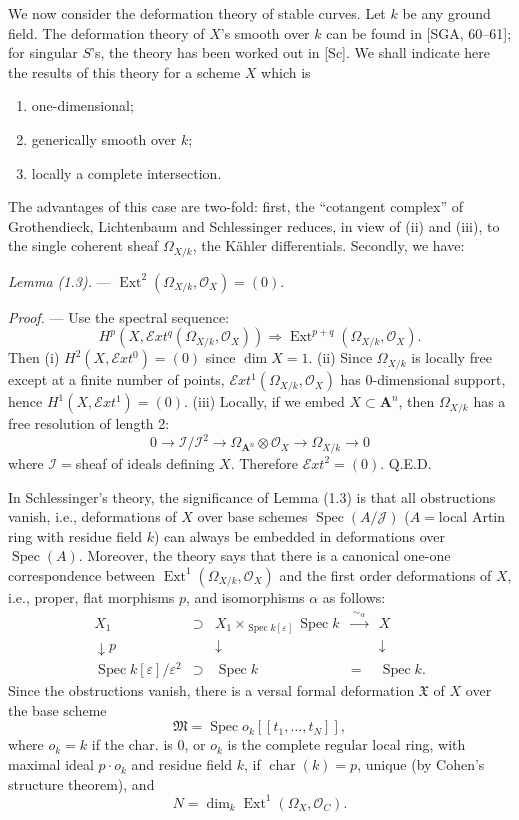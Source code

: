 \documentclass[10pt]{article}
\newcommand{\Spec}{\operatorname{Spec}}
\newcommand{\Ext}{\operatorname{Ext}}
\newcommand{\cO}{\mathcal O}
\newcommand{\cI}{\mathcal I}
\newcommand{\cExt}{\mathcal{E}xt}
\newcommand{\A}{\mathbf A}
\newcommand{\eps}{\varepsilon}
\begin{document}
We now consider the deformation theory of stable curves. Let $k$ be any ground field. The deformation theory of $X$'s smooth over $k$ can be found in [SGA, 60--61]; for singular $S$'s, the theory has been worked out in [Sc]. We shall indicate here the results of this theory for a scheme $X$ which is
\begin{enumerate}[label=(\roman*)]
\item one-dimensional;
\item generically smooth over $k$;
\item locally a complete intersection.
\end{enumerate}
The advantages of this case are two-fold: first, the ``cotangent complex'' of Grothendieck, Lichtenbaum and Schlessinger reduces, in view of (ii) and (iii), to the single coherent sheaf $\Omega_{X/k}$, the Kähler differentials. Secondly, we have:

\medskip
\noindent\textit{Lemma (1.3).} --- $\Ext^2(\Omega_{X/k},\cO_X)=(0)$.

\medskip
\noindent\textit{Proof.} --- Use the spectral sequence:
\[
H^p(X,\cExt^q(\Omega_{X/k},\cO_X))\Rightarrow \Ext^{p+q}(\Omega_{X/k},\cO_X).
\]
Then (i) $H^2(X,\cExt^0)=(0)$ since $\dim X=1$. (ii) Since $\Omega_{X/k}$ is locally free except at a finite number of points, $\cExt^1(\Omega_{X/k},\cO_X)$ has 0-dimensional support, hence $H^1(X,\cExt^1)=(0)$. (iii) Locally, if we embed $X\subset\A^n$, then $\Omega_{X/k}$ has a free resolution of length 2:
\[
0\to \cI/\cI^2\to \Omega_{\A^n}\otimes \cO_X\to \Omega_{X/k}\to 0
\]
where $\cI={}$sheaf of ideals defining $X$. Therefore $\cExt^2=(0)$. Q.E.D.

In Schlessinger's theory, the significance of Lemma (1.3) is that all obstructions vanish, i.e., deformations of $X$ over base schemes $\Spec(A/\mathcal J)$ ($A={}$local Artin ring with residue field $k$) can always be embedded in deformations over $\Spec(A)$. Moreover, the theory says that there is a canonical one-one correspondence between $\Ext^1(\Omega_{X/k},\cO_X)$ and the first order deformations of $X$, i.e., proper, flat morphisms $p$, and isomorphisms $\alpha$ as follows:
\[
\begin{array}{ccccc}
X_1 & \supset & X_1\times_{\Spec k[\eps]}\Spec k & \xrightarrow{\ \sim_{\alpha}\ } & X \\
\downarrow p && \downarrow && \downarrow \\
\Spec k[\eps]/\eps^2 & \supset & \Spec k & = & \Spec k.
\end{array}
\]
Since the obstructions vanish, there is a versal formal deformation $\mathfrak X$ of $X$ over the base scheme
\[
\mathfrak M=\Spec o_k[[t_1,\ldots,t_N]],
\]
where $o_k=k$ if the char. is 0, or $o_k$ is the complete regular local ring, with maximal ideal $p\cdot o_k$ and residue field $k$, if $\operatorname{char}(k)=p$, unique (by Cohen's structure theorem), and
\[
N=\dim_k \Ext^1(\Omega_X,\cO_C).
\]
\end{document}
